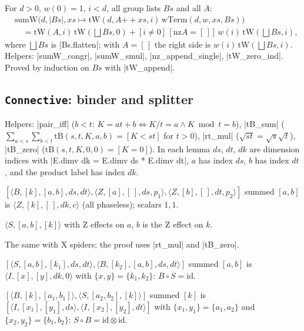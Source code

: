 \begin{theorem}
For $d>0$, $w(0)=1$, $i<d$, all group lists $Bs$ and all $A$:
\[\begin{aligned}
&\mathrm{sumW}\bigl(d,|Bs|,xs\mapsto\mathrm{tW}(d,A\mathbin{+\!\!+}xs,i)\,\mathrm{wTerm}(d,w,xs,Bs)\bigr)\\
&\quad=\mathrm{tW}(A,i)\,\mathrm{tW}(\textstyle\bigsqcup Bs,0)+[i\ne0]\,[\mathrm{nz}A=[\,]]\,w(i)\,\mathrm{tW}(\bigsqcup Bs,i),
\end{aligned}\]
where $\bigsqcup Bs$ is \lean|Bs.flatten|; with $A=[\,]$ the right side is $w(i)\,\mathrm{tW}(\bigsqcup
Bs,i)$. Helpers: \lean|sumW_congr|, \lean|sumW_smul|, \lean|nz_append_single|, \lean|tW_zero_ind|.
Proved by induction on $Bs$ with \lean|tW_append|.
\end{theorem}

\subsection{\texttt{Connective}: binder and splitter}

Helpers: \lean|pair_iff| ($b<t$: $K=at+b\iff K/t=a\land K\bmod t=b$), \lean|tB_sum|
($\sum_{a<s}\sum_{b<t}\mathrm{tB}(s,t,K,a,b)=[K<st]$ for $t>0$), \lean|rt_mul|
($\sqrt{st}=\sqrt s\sqrt t$), \lean|tB_zero| ($\mathrm{tB}(s,t,K,0,0)=[K=0]$).
In each lemma $ds$, $dt$, $dk$ are dimension indices with \lean|E.dimv dk = E.dimv ds * E.dimv dt|,
$a$ has index $ds$, $b$ has index $dt$, and the product label has index $dk$.
\begin{description}[style=nextline,font=\normalfont\ttfamily]
\item[connStates] $[\langle B,[k],[a,b],ds,dt\rangle,\langle Z,[a],[\,],ds,p_1\rangle,\langle
  Z,[b],[\,],dt,p_2\rangle]$ summed $[a,b]$ is $\langle Z,[k],[\,],dk,c\rangle$ (all phaseless);
  scalars $1,1$.
\item[connEffects] $\langle S,[a,b],[k]\rangle$ with Z effects on $a$, $b$ is the Z effect on $k$.
\item[connStatesX, connEffectsX] The same with X spiders; the proof uses \lean|rt_mul| and
  \lean|tB_zero|.
\item[connInverse] $[\langle S,[a,b],[k_1],ds,dt\rangle,\langle B,[k_2],[a,b],ds,dt\rangle]$ summed
  $[a,b]$ is $\langle I,[x],[y],dk,0\rangle$ with $\{x,y\}=\{k_1,k_2\}$: $B\circ S=\mathrm{id}$.
\item[connInverseBind] $[\langle B,[k],[a_1,b_1]\rangle,\langle S,[a_2,b_2],[k]\rangle]$ summed $[k]$
  is $[\langle I,[x_1],[y_1],ds\rangle,\langle I,[x_2],[y_2],dt\rangle]$ with $\{x_1,y_1\}=\{a_1,a_2\}$
  and $\{x_2,y_2\}=\{b_1,b_2\}$: $S\circ B=\mathrm{id}\otimes\mathrm{id}$.
\end{description}


